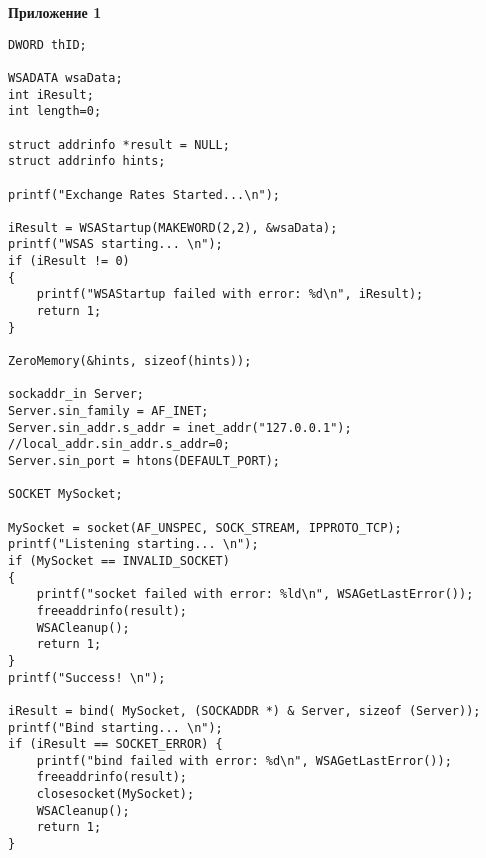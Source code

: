 \documentclass[a4paper,14pt]{article}
\begin{document}
\textbf{Приложение 1}
\begin{lstlisting}
DWORD thID;

WSADATA wsaData;
int iResult; 
int length=0;

struct addrinfo *result = NULL;
struct addrinfo hints;

printf("Exchange Rates Started...\n");

iResult = WSAStartup(MAKEWORD(2,2), &wsaData);
printf("WSAS starting... \n");
if (iResult != 0) 
{
	printf("WSAStartup failed with error: %d\n", iResult);
	return 1;
}

ZeroMemory(&hints, sizeof(hints));

sockaddr_in Server; 
Server.sin_family = AF_INET;
Server.sin_addr.s_addr = inet_addr("127.0.0.1"); //local_addr.sin_addr.s_addr=0; 
Server.sin_port = htons(DEFAULT_PORT); 

SOCKET MySocket;

MySocket = socket(AF_UNSPEC, SOCK_STREAM, IPPROTO_TCP);
printf("Listening starting... \n");
if (MySocket == INVALID_SOCKET) 
{
	printf("socket failed with error: %ld\n", WSAGetLastError());
	freeaddrinfo(result);
	WSACleanup();
	return 1;
}
printf("Success! \n");

iResult = bind( MySocket, (SOCKADDR *) & Server, sizeof (Server));
printf("Bind starting... \n");
if (iResult == SOCKET_ERROR) {
	printf("bind failed with error: %d\n", WSAGetLastError());
	freeaddrinfo(result);
	closesocket(MySocket);
	WSACleanup();
	return 1;
}
\end{lstlisting}
\end{document}
